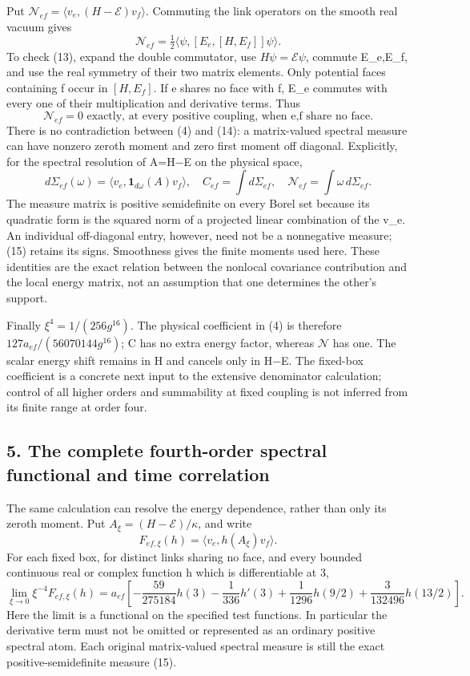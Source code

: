 \documentclass[
  11pt,
]{article}
\begin{document}
Put \(\mathcal N_{ef}=\langle v_e,(H-\mathcal E)v_f\rangle\). Commuting
the link operators on the smooth real vacuum gives \[
 \mathcal N_{ef}=\tfrac12
 \langle\psi,[E_e,[H,E_f]]\psi\rangle.
\tag{13}
\] To check (13), expand the double commutator, use
\(H\psi=\mathcal E\psi\), commute E\_e,E\_f, and use the real symmetry
of their two matrix elements. Only potential faces containing f occur in
\([H,E_f]\). If e shares no face with f, E\_e commutes with every one of
their multiplication and derivative terms. Thus \[
 \boxed{\mathcal N_{ef}=0\text{ exactly, at every positive coupling,
 when e,f share no face}.}
\tag{14}
\] There is no contradiction between (4) and (14): a matrix-valued
spectral measure can have nonzero zeroth moment and zero first moment
off diagonal. Explicitly, for the spectral resolution of A=H−E on the
physical space, \[
 d\Sigma_{ef}(\omega)=\langle v_e,\mathbf1_{d\omega}(A)v_f\rangle,
 \quad C_{ef}=\int d\Sigma_{ef},\quad
 \mathcal N_{ef}=\int\omega\,d\Sigma_{ef}.
\tag{15}
\] The measure matrix is positive semidefinite on every Borel set
because its quadratic form is the squared norm of a projected linear
combination of the v\_e. An individual off-diagonal entry, however, need
not be a nonnegative measure; (15) retains its signs. Smoothness gives
the finite moments used here. These identities are the exact relation
between the nonlocal covariance contribution and the local energy
matrix, not an assumption that one determines the other's support.

Finally \(\xi^4=1/(256g^{16})\). The physical coefficient in (4) is
therefore \(127a_{ef}/(56070144g^{16})\); C has no extra energy factor,
whereas \(\mathcal N\) has one. The scalar energy shift remains in H and
cancels only in H−E. The fixed-box coefficient is a concrete next input
to the extensive denominator calculation; control of all higher orders
and summability at fixed coupling is not inferred from its finite range
at order four.

\subsection{5. The complete fourth-order spectral functional and time
correlation}\label{magnetic-part-10-the-complete-fourth-order-spectral-functional-and-time-correlation}

The same calculation can resolve the energy dependence, rather than only
its zeroth moment. Put \(A_\xi=(H-\mathcal E)/\kappa\), and write \[
 F_{ef,\xi}(h)=\langle v_e,h(A_\xi)v_f\rangle.
\] For each fixed box, for distinct links sharing no face, and every
bounded continuous real or complex function h which is differentiable at
3, \[
\boxed{\lim_{\xi\to0}\xi^{-4}F_{ef,\xi}(h)
 =a_{ef}\left[-\frac{59}{275184}h(3)-\frac1{336}h'(3)
             +\frac1{1296}h(9/2)+\frac3{132496}h(13/2)\right].}
\tag{16}
\] Here the limit is a functional on the specified test functions. In
particular the derivative term must not be omitted or represented as an
ordinary positive spectral atom. Each original matrix-valued spectral
measure is still the exact positive-semidefinite measure (15).
\end{document}
